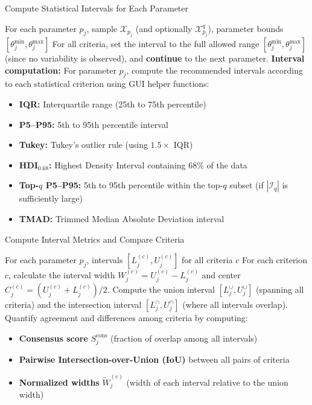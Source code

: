 \documentclass[12pt,a4paper]{article}
\begin{document}
\begin{algorithm}[H]
\caption{Compute Statistical Intervals for Each Parameter}
\begin{algorithmic}[1]
\REQUIRE For each parameter $p_j$, sample $\mathcal{X}_{p_j}$ (and optionally $\mathcal{X}^{q}_{p_j}$), parameter bounds $[\theta_j^{\min}, \theta_j^{\max}]$
        \STATE For all criteria, set the interval to the full allowed range $[\theta_j^{\min}, \theta_j^{\max}]$ (since no variability is observed), and \textbf{continue} to the next parameter.
    \ENDIF
    \STATE \textbf{Interval computation:} For parameter $p_j$, compute the recommended intervals according to each statistical criterion using GUI helper functions:
        \begin{itemize}
            \item \textbf{IQR:} Interquartile range (25th to 75th percentile)
            \item \textbf{P5--P95:} 5th to 95th percentile interval
            \item \textbf{Tukey:} Tukey's outlier rule (using $1.5\times$ IQR)
            \item \textbf{HDI$_{0.68}$:} Highest Density Interval containing 68\% of the data
            \item \textbf{Top-$q$ P5--P95:} 5th to 95th percentile within the top-$q$ subset (if $|\mathcal{I}_q|$ is sufficiently large)
            \item \textbf{TMAD:} Trimmed Median Absolute Deviation interval
        \end{itemize}
\ENDFOR
\end{algorithmic}
\end{algorithm}

\begin{algorithm}[H]
\caption{Compute Interval Metrics and Compare Criteria}
\begin{algorithmic}[1]
\REQUIRE For each parameter $p_j$, intervals $[L^{(c)}_j, U^{(c)}_j]$ for all criteria $c$
    \STATE For each criterion $c$, calculate the interval width $W^{(c)}_j = U^{(c)}_j - L^{(c)}_j$ and center $C^{(c)}_j = (U^{(c)}_j + L^{(c)}_j)/2$.
    \STATE Compute the union interval $[L^{\cup}_j, U^{\cup}_j]$ (spanning all criteria) and the intersection interval $[L^{\cap}_j, U^{\cap}_j]$ (where all intervals overlap).
    \STATE Quantify agreement and differences among criteria by computing:
        \begin{itemize}
            \item \textbf{Consensus score} $S^{\text{cons}}_j$ (fraction of overlap among all intervals)
            \item \textbf{Pairwise Intersection-over-Union (IoU)} between all pairs of criteria
            \item \textbf{Normalized widths} $\tilde W^{(c)}_j$ (width of each interval relative to the union width)
        \end{itemize}
\ENDFOR
\end{algorithmic}
\end{algorithm}
\end{document}
